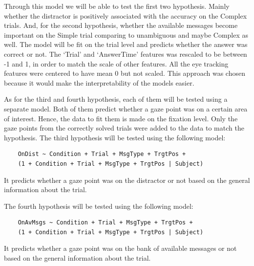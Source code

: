 Through this model we will be able to test the first two hypothesis. Mainly whether the distractor is positively associated with the accuracy on the Complex trials. And, for the second hypothesis, whether the available messages become important on the Simple trial comparing to unambiguous and maybe Complex as well. The model will be fit on the trial level and predicts whether the answer was correct or not. The `Trial' and `AnswerTime' features was rescaled to be between -1 and 1, in order to match the scale of other features. All the eye tracking features were centered to have mean 0 but not scaled. This approach was chosen because it would make the interpretability of the models easier.

As for the third and fourth hypothesis, each of them will be tested using a separate model. Both of them predict whether a gaze point was on a certain area of interest. Hence, the data to fit them is made on the fixation level. Only the gaze points from the correctly solved trials were added to the data to match the hypothesis. The third hypothesis will be tested using the following model:
\begin{verbatim}
    OnDist ~ Condition + Trial + MsgType + TrgtPos +
    (1 + Condition + Trial + MsgType + TrgtPos | Subject)
\end{verbatim}
It predicts whether a gaze point was on the distractor or not based on the general information about the trial. 

The fourth hypothesis will be tested using the following model:
\begin{verbatim}
    OnAvMsgs ~ Condition + Trial + MsgType + TrgtPos +
    (1 + Condition + Trial + MsgType + TrgtPos | Subject)
\end{verbatim}
It predicts whether a gaze point was on the bank of available messages or not based on the general information about the trial. 

